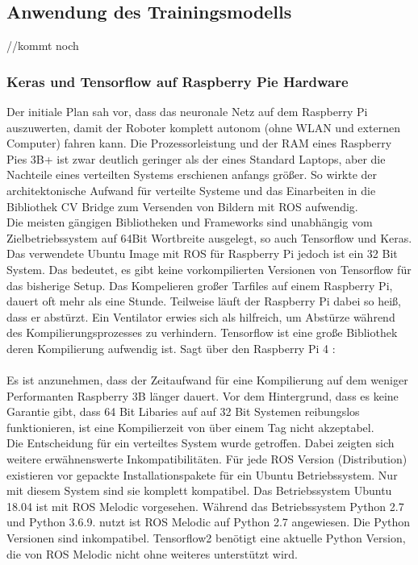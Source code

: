 \documentclass[conference]{IEEEtran}
\begin{document}
	
	\subsection{Anwendung des Trainingsmodells} %
	//kommt noch
	\subsubsection{Keras und Tensorflow auf Raspberry Pie Hardware}
	Der initiale Plan sah vor, dass das neuronale Netz auf dem Raspberry Pi auszuwerten, damit der Roboter komplett autonom (ohne WLAN und externen Computer) fahren kann. Die Prozessorleistung und der RAM eines Raspberry Pies 3B+ ist zwar deutlich geringer als der eines Standard Laptops, aber die Nachteile eines verteilten Systems erschienen anfangs größer. So wirkte der architektonische Aufwand für  verteilte Systeme und  das Einarbeiten in die Bibliothek CV Bridge zum Versenden von Bildern mit ROS aufwendig. \\
	Die meisten gängigen Bibliotheken und Frameworks sind unabhängig vom Zielbetriebssystem auf 64Bit Wortbreite ausgelegt, so auch Tensorflow und Keras.  Das verwendete Ubuntu Image mit ROS für Raspberry Pi jedoch ist ein 32 Bit System. Das bedeutet, es gibt keine vorkompilierten Versionen von Tensorflow für das bisherige Setup. Das Kompelieren großer Tarfiles auf einem Raspberry Pi, dauert oft mehr als eine Stunde. Teilweise läuft der Raspberry Pi dabei so heiß, dass er abstürzt. Ein Ventilator erwies sich als hilfreich, um  Abstürze während des Kompilierungsprozesses zu verhindern. Tensorflow ist eine große Bibliothek deren Kompilierung aufwendig ist. 
	Sagt über den Raspberry Pi 4   : \\
	 \\
	Es ist  anzunehmen, dass der Zeitaufwand für eine Kompilierung auf dem weniger Performanten Raspberry 3B länger dauert. Vor dem Hintergrund, dass es keine Garantie gibt, dass 64 Bit Libaries auf auf 32 Bit Systemen reibungslos funktionieren, ist eine Kompilierzeit von über einem Tag nicht akzeptabel. \\
	
	Die Entscheidung für ein verteiltes System wurde getroffen. Dabei zeigten sich weitere erwähnenswerte Inkompatibilitäten. Für jede ROS Version (Distribution) existieren vor gepackte Installationspakete für ein Ubuntu Betriebssystem. Nur mit diesem System sind sie komplett kompatibel. Das Betriebssystem Ubuntu 18.04 ist mit ROS Melodic vorgesehen. Während das Betriebssystem Python 2.7 und Python 3.6.9. nutzt ist ROS Melodic auf Python 2.7 angewiesen. Die Python Versionen sind inkompatibel. Tensorflow2 benötigt eine aktuelle Python Version, die von ROS Melodic nicht ohne weiteres unterstützt wird. \\
	
\end{document}
